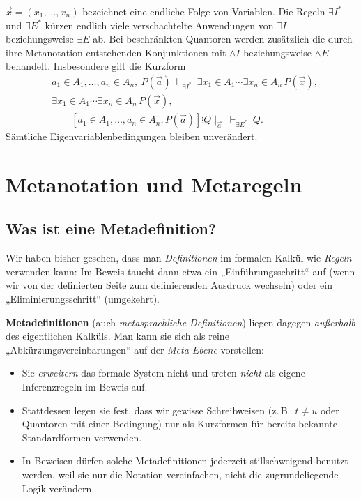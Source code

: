 \documentclass[main.tex]{subfiles}
\begin{document}
\begin{remark}
\(\vec x=(x_1,\ldots,x_n)\) bezeichnet eine endliche Folge von Variablen.
Die Regeln \(\exists I^{*}\) und \(\exists E^{*}\) kürzen endlich viele
verschachtelte Anwendungen von \(\exists I\) beziehungsweise \(\exists E\)
ab. Bei beschränkten Quantoren werden zusätzlich die durch ihre Metanotation
entstehenden Konjunktionen mit \(\land I\) beziehungsweise \(\land E\)
behandelt. Insbesondere gilt die Kurzform
\[
\begin{aligned}
  &a_1\in A_1,\ldots,a_n\in A_n,\ P(\vec a)
    \ \vdash_{\exists I^{*}}\
    \exists x_1\in A_1\cdots\exists x_n\in A_n\,P(\vec x),\\[2pt]
  &\exists x_1\in A_1\cdots\exists x_n\in A_n\,P(\vec x),\\[-2pt]
  &\qquad
    [a_1\in A_1,\ldots,a_n\in A_n,P(\vec a)]\vdots Q\mid_{\vec a}
    \ \vdash_{\exists E^{*}}\ Q.
\end{aligned}
\]
Sämtliche Eigenvariablenbedingungen bleiben unverändert.
\end{remark}




\section{Metanotation und Metaregeln}

\subsection{Was ist eine Metadefinition?}

Wir haben bisher gesehen, dass man \emph{Definitionen} im formalen
Kalkül wie \emph{Regeln} verwenden kann: Im Beweis taucht dann etwa
ein „Einführungsschritt“ auf (wenn wir von der definierten Seite zum
definierenden Ausdruck wechseln) oder ein „Eliminierungsschritt“
(umgekehrt).

\medskip

\textbf{Metadefinitionen} (auch \emph{metasprachliche Definitionen})
liegen dagegen \emph{außerhalb} des eigentlichen Kalküls. Man kann sie
sich als reine „Abkürzungsvereinbarungen“ auf der \emph{Meta-Ebene}
vorstellen:

\begin{itemize}
  \item Sie \emph{erweitern} das formale System nicht und treten
        \emph{nicht} als eigene Inferenzregeln im Beweis auf.
  \item Stattdessen legen sie fest, dass wir gewisse Schreibweisen
        (z.\,B.\ \(t \neq u\) oder Quantoren mit einer Bedingung)
        nur als Kurzformen für bereits bekannte Standardformen
        verwenden.
  \item In Beweisen dürfen solche Metadefinitionen jederzeit stillschweigend
        benutzt werden, weil sie nur die Notation vereinfachen, nicht die
        zugrundeliegende Logik verändern.
\end{itemize}
\end{document}
